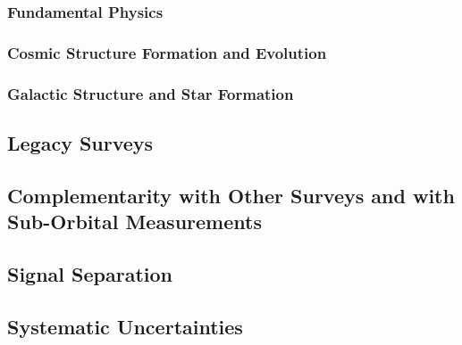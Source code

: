 \documentclass[12pt]{article}
\begin{document}
\subsubsection{Fundamental Physics} %
\label{sec:fundamentalsci}





\subsubsection{Cosmic Structure Formation and Evolution} %
\label{sec:extragalacticsci}



\subsubsection{Galactic Structure and Star Formation} %
\label{sec:galacticsci}



\subsection{Legacy Surveys} %




\subsection{Complementarity with Other Surveys and with Sub-Orbital Measurements} %




\subsection{Signal Separation}%
\label{sec:signal_separation}




\subsection{Systematic Uncertainties}%
\end{document}
